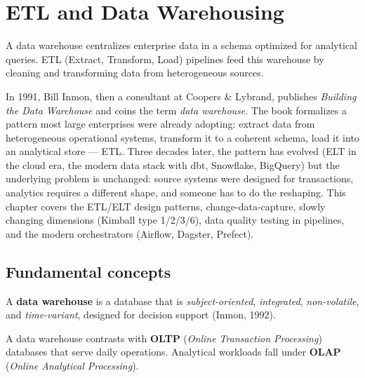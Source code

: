 \chapter{ETL and Data Warehousing}
\label{ch:etl}

\begin{intuition}[title=\textbf{Central idea}]
A data warehouse centralizes enterprise data in a schema optimized for
analytical queries. ETL (Extract, Transform, Load) pipelines feed this
warehouse by cleaning and transforming data from heterogeneous sources.
\end{intuition}

In 1991, Bill Inmon, then a consultant at Coopers \& Lybrand, publishes \emph{Building the Data Warehouse} and coins the term \emph{data warehouse}. The book formalizes a pattern most large enterprises were already adopting: extract data from heterogeneous operational systems, transform it to a coherent schema, load it into an analytical store --- ETL. Three decades later, the pattern has evolved (ELT in the cloud era, the modern data stack with dbt, Snowflake, BigQuery) but the underlying problem is unchanged: source systems were designed for transactions, analytics requires a different shape, and someone has to do the reshaping. This chapter covers the ETL/ELT design patterns, change-data-capture, slowly changing dimensions (Kimball type 1/2/3/6), data quality testing in pipelines, and the modern orchestrators (Airflow, Dagster, Prefect).

\section{Fundamental concepts}

\begin{definition}
A \textbf{data warehouse} is a database that is \emph{subject-oriented},
\emph{integrated}, \emph{non-volatile}, and \emph{time-variant}, designed
for decision support (Inmon, 1992).
\end{definition}

\begin{remark}
A data warehouse contrasts with \textbf{OLTP} (\emph{Online Transaction
Processing}) databases that serve daily operations. Analytical workloads
fall under \textbf{OLAP} (\emph{Online Analytical Processing}).
\end{remark}

